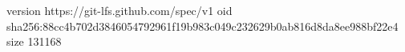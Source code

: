 version https://git-lfs.github.com/spec/v1
oid sha256:88cc4b702d3846054792961f19b983c049c232629b0ab816d8da8ee988bf22e4
size 131168
